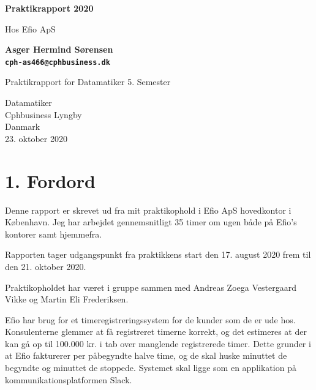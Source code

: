\documentclass[11pt]{report}
\begin{document}
\begin{titlepage}
  \begin{center}
      \vspace*{1cm}

      \Huge
      \textbf{Praktikrapport 2020}

      \vspace{0.5cm}
      \LARGE
      Hos Efio ApS

      \vspace{1.5cm}

      \textbf{
        Asger Hermind Sørensen\\
        \texttt{cph-as466@cphbusiness.dk}
      }

      \vfill

      Praktikrapport for Datamatiker 5. Semester

      \vspace{0.8cm}

      \Large
      Datamatiker\\
      Cphbusiness Lyngby\\
      Danmark\\
      23. oktober 2020

  \end{center}
\end{titlepage}
\renewcommand{\cftchapleader}{\cftdotfill{\cftdotsep}}
\tableofcontents
\newpage

\chapter*{1. Fordord}
Denne rapport er skrevet ud fra mit praktikophold i Efio ApS hovedkontor i København. 
Jeg har arbejdet gennemsnitligt 35 timer om ugen både på Efio’s kontorer samt hjemmefra.

Rapporten tager udgangspunkt fra praktikkens start den 17. august 2020 frem til den 21. oktober 2020.

Praktikopholdet har været i gruppe sammen med Andreas Zoega Vestergaard Vikke og Martin Eli Frederiksen. 

Efio har brug for et timeregistreringssystem for de kunder som de er ude hos. Konsulenterne glemmer at få registreret timerne korrekt, og det estimeres at der kan gå op til 100.000 kr. i tab over manglende registrerede timer. Dette grunder i at Efio fakturerer per påbegyndte halve time, og de skal huske minuttet de begyndte og minuttet de stoppede.
Systemet skal ligge som en applikation på kommunikationsplatformen Slack. 
 
\end{document}
